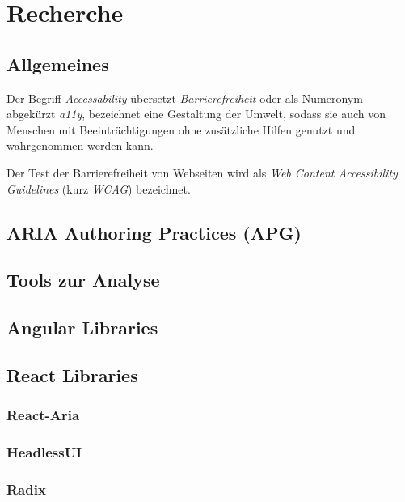 \chapter{Recherche}

\label{Chapter3}

\section{Allgemeines}

Der Begriff \emph{Accessability} übersetzt \emph{Barrierefreiheit} oder als Numeronym abgekürzt \emph{a11y}, bezeichnet eine Gestaltung der Umwelt, sodass sie auch von Menschen mit Beeinträchtigungen ohne zusätzliche Hilfen genutzt und wahrgenommen werden kann. \cite{Bundesfachstelle_Barrierefreiheit_a11y_Definition}

Der Test der Barrierefreiheit von Webseiten wird als \emph{Web Content Accessibility Guidelines} (kurz \emph{WCAG}) bezeichnet.

\section{ARIA Authoring Practices (APG)}

\section{Tools zur Analyse}

\section{Angular Libraries}

\section{React Libraries}

\subsection{React-Aria}

\subsection{HeadlessUI}

\subsection{Radix}
